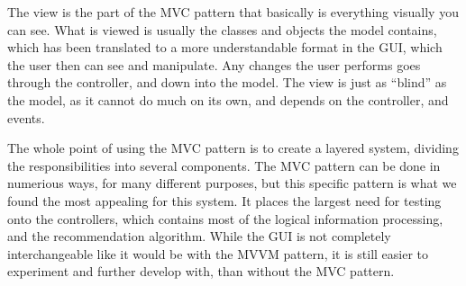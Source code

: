 The view is the part of the MVC pattern that basically is everything visually you can see. What is viewed is usually the classes and objects the model contains, which has been translated to a more understandable format in the GUI, which the user then can see and manipulate. Any changes the user performs goes through the controller, and down into the model. The view is just as “blind” as the model, as it cannot do much on its own, and depends on the controller, and events.

The whole point of using the MVC pattern is to create a layered system, dividing the responsibilities into several components. The MVC pattern can be done in numerious ways, for many different purposes, but this specific pattern is what we found the most appealing for this system. It places the largest need for testing onto the controllers, which contains most of the logical information processing, and the recommendation algorithm. While the GUI is not completely interchangeable like it would be with the MVVM pattern, it is still easier to experiment and further develop with, than without the MVC pattern.